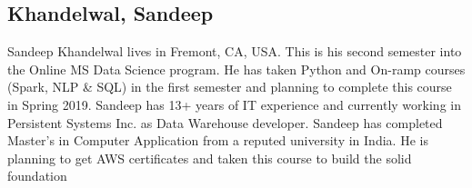 \subsection{Khandelwal, Sandeep}

Sandeep Khandelwal lives in Fremont, CA, USA. This is his second
semester into the Online MS Data Science program. He has taken Python
and On-ramp courses (Spark, NLP \& SQL) in the first semester and
planning to complete this course in Spring 2019. Sandeep has 13+ years
of IT experience and currently working in Persistent Systems Inc. as
Data Warehouse developer. Sandeep has completed Master's in Computer
Application from a reputed university in India. He is planning to get
AWS certificates and taken this course to build the solid foundation

